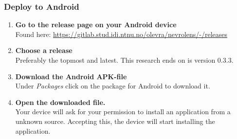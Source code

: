 \subsubsection*{Deploy to Android}

\begin{enumerate}
    \item {
        \textbf{Go to the release page on your Android device}\\
        Found here: \url{https://gitlab.stud.idi.ntnu.no/olevra/nevrolens/-/releases}
    }
    \item {
        \textbf{Choose a release}\\
        Preferably the topmost and latest. This research ends on is version 0.3.3. 
    }

    \item {
        \textbf{Download the Android APK-file}\\
        Under \textit{Packages} click on the package for Android to download it.
    }

    \item {
        \textbf{Open the downloaded file.}\\
        Your device will ask for your permission to install an application from a unknown source. Accepting this, the device will start installing the application.
    }

\end{enumerate}